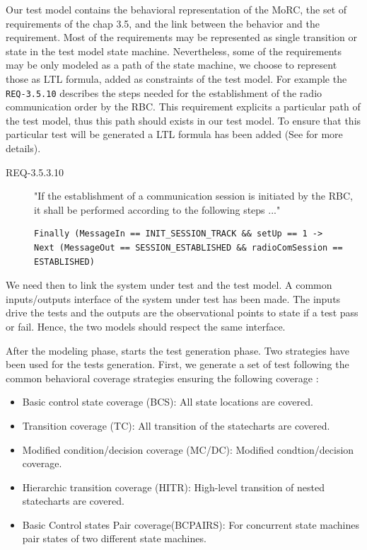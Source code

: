 Our test model contains the behavioral representation of the MoRC, the
set of requirements of the chap 3.5, and the link between the behavior
and the requirement.  Most of the requirements may be represented as
single transition or state in the test model state
machine. Nevertheless, some of the requirements may be only modeled as
a path of the state machine, we choose to represent those as LTL
formula, added as constraints of the test model. For example the
\verb+REQ-3.5.10+ describes the steps needed for the establishment of
the radio communication order by the RBC. This requirement explicits a
particular path of the test model, thus this path should exists in our
test model. To ensure that this particular test will be generated a LTL
formula has been added (See \cite{braunstein_MorC_2013} for more
details).

\begin{description}
\item[REQ-3.5.3.10] "If the establishment of a communication session is
initiated by the RBC, it shall be performed according to the following steps
..."
\vspace{-1em}
\begin{verbatim}
Finally (MessageIn == INIT_SESSION_TRACK && setUp == 1 -> 
Next (MessageOut == SESSION_ESTABLISHED && radioComSession == ESTABLISHED)
\end{verbatim}
\end{description}

We need then to link the system under test and the test model.  A
common inputs/outputs interface of the system under test has been
made. The inputs drive the tests and the outputs are the observational
points to state if a test pass or fail. Hence, the two models should
respect the same interface.

After the modeling phase, starts the test generation phase.
Two strategies have been used for the tests generation. First, we
generate a set of test following the common behavioral coverage
strategies ensuring the following coverage :
\begin{itemize}
\item  Basic control state coverage (BCS): All state locations are covered.
\item  Transition coverage (TC): All transition of the statecharts are covered.
\item  Modified condition/decision coverage (MC/DC): Modified condtion/decision coverage.
\item  Hierarchic transition coverage (HITR): High-level transition of
  nested statecharts are covered.
\item  Basic Control states Pair coverage(BCPAIRS): For concurrent state
  machines pair states of two different state machines. 
\end{itemize}

